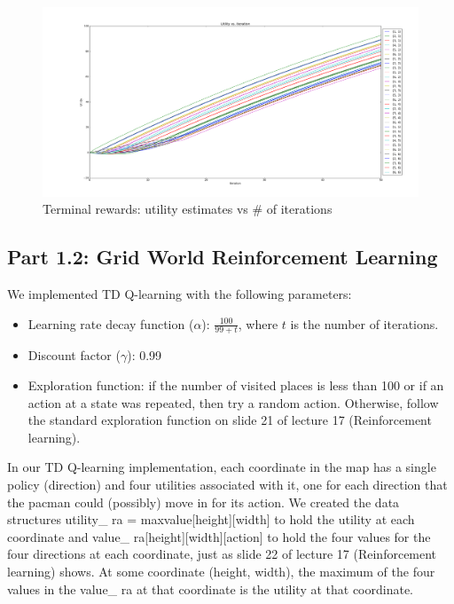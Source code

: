 \paragraph{}
\begin{figure}[H]
  \centering
  \includegraphics[width=1\linewidth]{graphics/inf_11_util_iters.png}
  \caption{Terminal rewards: utility estimates vs \# of iterations}
\end{figure}


\subsection{Part 1.2: Grid World Reinforcement Learning}

We implemented TD Q-learning with the following parameters:
\begin{itemize}
  \item Learning rate decay function ($\alpha$): $\frac{100}{99+t}$, where $t$ is the number of iterations.
  \item Discount factor ($\gamma$): 0.99
  \item Exploration function: if the number of visited places is less than 100 or if an action at a state was repeated, then try a random action. Otherwise, follow the standard exploration function on slide 21 of lecture 17 (Reinforcement learning).
\end{itemize}

In our TD Q-learning implementation, each coordinate in the map has a single policy (direction) and four utilities associated with it, one for each direction that the pacman could (possibly) move in for its action. We created the data structures utility\_ ra = max{value[height][width]} to hold the utility at each coordinate and value\_ ra[height][width][action] to hold the four values for the four directions at each coordinate, just as slide 22 of lecture 17 (Reinforcement learning) shows. At some coordinate (height, width), the maximum of the four values in the value\_ ra at that coordinate is the utility at that coordinate.

